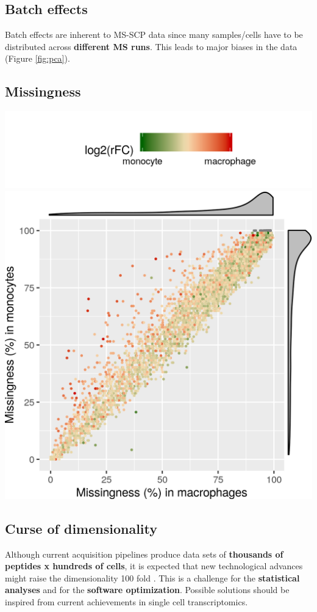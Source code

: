 \documentclass{article}
\begin{document}
\begin{multicols}{2}
\noindent
\begin{minipage}[h]{0.5 \linewidth}
  \subsection*{Batch effects}
  \large
  Batch effects are inherent to MS-SCP data since many samples/cells have to be distributed across \textbf{different MS runs}. This leads to major biases in the data (Figure \ref{fig:pca}).
  \subsection*{Missingness}
\end{minipage}
\hspace{0.4cm}
\begin{minipage}[h]{0.5\linewidth}
  \begin{center}
  \includegraphics[width=0.4\linewidth, trim={10cm 3cm 7cm 0},clip]{figs/missing-leg.png}
  \includegraphics[width=0.8\linewidth, trim={0 2cm 0 2cm}]{figs/missing.png}
  \end{center}
\end{minipage}

\noindent
\begin{minipage}[h]{\linewidth}
  \subsection*{Curse of dimensionality}
  \large
  Although current acquisition pipelines produce data sets of \textbf{thousands of peptides x hundreds of cells}, it is expected that new technological advances might raise the dimensionality 100 fold \cite{Specht2019-jm}. This is a challenge for the \textbf{statistical analyses} and for the \textbf{software optimization}. Possible solutions should be inspired from current achievements in single cell transcriptomics. 
\end{minipage}


\end{multicols}
\end{document}

